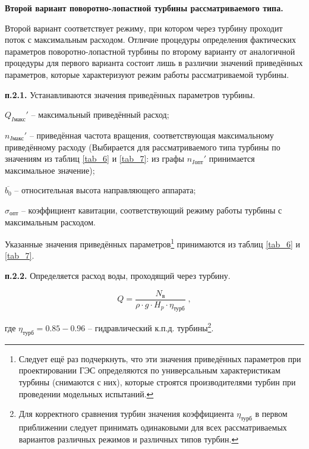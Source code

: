 \newpage


\begin{center}
\textbf{Второй вариант поворотно-лопастной турбины рассматриваемого типа.}
\end{center}

Второй вариант соответствует режиму, при котором через турбину проходит поток с максимальным расходом. Отличие процедуры определения фактических параметров поворотно-лопастной турбины по второму варианту от аналогичной процедуры для первого варианта состоит лишь в различии значений приведённых параметров, которые характеризуют режим работы рассматриваемой турбины.

\vspace{0.5cm}

\textbf{п.2.1.} Устанавливаются значения приведённых параметров турбины.

$Q_{I\text{макс}}'$ -- максимальный приведённый расход;

$n_{I\text{макс}}'$ -- приведённая частота вращения, соответствующая максимальному приведённому расходу (Выбирается для рассматриваемого типа турбины по значениям из таблиц \ref{tab_6} и \ref{tab_7}: из графы $n_{I\text{опт}}'$ принимается максимальное значение);

$\overline{b_0}$ -- относительная высота направляющего аппарата;

$\sigma_{\text{опт}}$ -- коэффициент кавитации, соответствующий режиму работы турбины с максимальным расходом.

\vspace{0.5cm}

Указанные значения приведённых параметров\footnote{Следует ещё раз подчеркнуть, что эти значения приведённых параметров при проектировании ГЭС определяются по универсальным характеристикам турбины (снимаются с них), которые строятся производителями турбин при проведении модельных испытаний.} принимаются из таблиц \ref{tab_6} и \ref{tab_7}.



\vspace{0.5cm}

\textbf{п.2.2.} Определяется расход воды, проходящий через турбину.

$$
  Q = \frac{N_{\text{в}}}{\rho \cdot g \cdot H_p \cdot \eta_{\text{турб}} } \; ,
$$

где $\eta_{\text{турб}} = 0.85 - 0.96$ -- гидравлический к.п.д. турбины\footnote{Для корректного сравнения турбин значения коэффициента $\eta_{\text{турб}}$ в первом приближении следует принимать одинаковыми для всех рассматриваемых вариантов различных режимов и различных типов турбин.}. 

